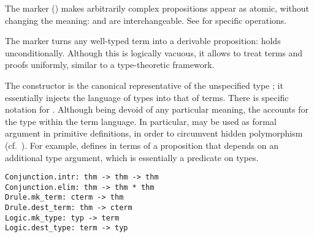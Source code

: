\begin{isabellebody}
\begin{isamarkuptext}
  The  marker (\isa{{\isacharhash}}) makes arbitrarily complex
  propositions appear as atomic, without changing the meaning:  and  are interchangeable.  See
   for specific operations.

  The  marker turns any well-typed term into a derivable
  proposition:  holds unconditionally.  Although
  this is logically vacuous, it allows to treat terms and proofs
  uniformly, similar to a type-theoretic framework.

  The  constructor is the canonical representative of
  the unspecified type ; it essentially injects the
  language of types into that of terms.  There is specific notation
   for .
  Although being devoid of any particular meaning, the  accounts for the type \isa{{\isasymtau}} within the term
  language.  In particular,  may be used as formal
  argument in primitive definitions, in order to circumvent hidden
  polymorphism (cf.\ ).  For example,  defines  in terms of
  a proposition  that depends on an additional type
  argument, which is essentially a predicate on types.%
\end{isamarkuptext}%
\isamarkuptrue%
%
\isadelimmlref
%
\endisadelimmlref
%
\isatagmlref
%
\begin{isamarkuptext}%
\begin{mldecls}
  \verb|Conjunction.intr: thm -> thm -> thm| \\
  \verb|Conjunction.elim: thm -> thm * thm| \\
  \verb|Drule.mk_term: cterm -> thm| \\
  \verb|Drule.dest_term: thm -> cterm| \\
  \verb|Logic.mk_type: typ -> term| \\
  \verb|Logic.dest_type: term -> typ| \\
  \end{mldecls}


\end{isamarkuptext}
\end{isabellebody}
